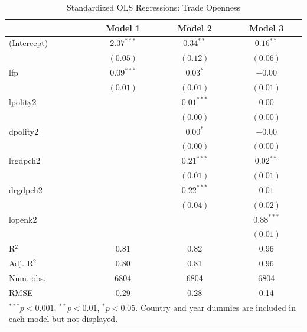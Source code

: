 \documentclass[12pt,a4paper]{article}\usepackage[]{graphicx}\usepackage[]{color}
\begin{document}
\begin{table}
\begin{center}
\begin{footnotesize}
\begin{tabular}{l c c c }
\hline
 & Model 1 & Model 2 & Model 3 \\
\hline
(Intercept) & $2.37^{***}$ & $0.34^{**}$  & $0.16^{**}$  \\
            & $(0.05)$     & $(0.12)$     & $(0.06)$     \\
lfp         & $0.09^{***}$ & $0.03^{*}$   & $-0.00$      \\
            & $(0.01)$     & $(0.01)$     & $(0.01)$     \\
lpolity2    &              & $0.01^{***}$ & $0.00$       \\
            &              & $(0.00)$     & $(0.00)$     \\
dpolity2    &              & $0.00^{*}$   & $-0.00$      \\
            &              & $(0.00)$     & $(0.00)$     \\
lrgdpch2    &              & $0.21^{***}$ & $0.02^{**}$  \\
            &              & $(0.01)$     & $(0.01)$     \\
drgdpch2    &              & $0.22^{***}$ & $0.01$       \\
            &              & $(0.04)$     & $(0.02)$     \\
lopenk2     &              &              & $0.88^{***}$ \\
            &              &              & $(0.01)$     \\
\hline
R$^2$       & 0.81         & 0.82         & 0.96         \\
Adj. R$^2$  & 0.80         & 0.81         & 0.96         \\
Num. obs.   & 6804         & 6804         & 6804         \\
RMSE        & 0.29         & 0.28         & 0.14         \\
\hline
\multicolumn{4}{l}{\tiny{$^{***}p<0.001$, $^{**}p<0.01$, $^*p<0.05$. Country and year dummies are included in each model but not displayed.}}
\end{tabular}
\end{footnotesize}
\caption{Standardized OLS Regressions: Trade Openness}
\label{table:coefficients}
\end{center}
\end{table}
\end{document}
